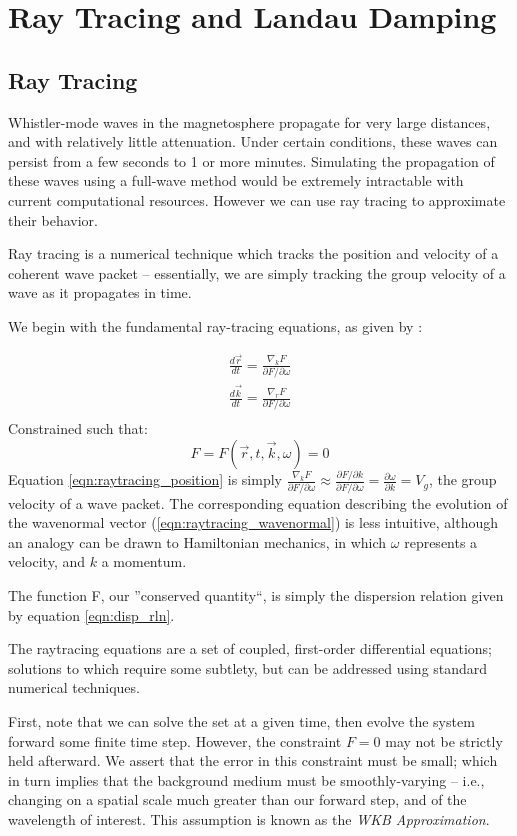 \section{Ray Tracing and Landau Damping}
\subsection{Ray Tracing}
Whistler-mode waves in the magnetosphere propagate for very large distances, and with relatively little attenuation. Under certain conditions, these waves can persist from a few seconds to 1 or more minutes. Simulating the propagation of these waves using a full-wave method would be extremely intractable with current computational resources. However we can use ray tracing to approximate their behavior.

Ray tracing is a numerical technique which tracks the position and velocity of a coherent wave packet -- essentially, we are simply tracking the group velocity of a wave as it propagates in time. 

We begin with the fundamental ray-tracing equations, as given by \cite{Stix1992}:

\begin{eqnarray}
\frac{d\vec{r}}{dt} = \frac{\nabla_kF}{\partial F/\partial \omega} \label{eqn:raytracing_position}\\
\frac{d\vec{k}}{dt} = \frac{\nabla_rF}{\partial F/\partial \omega} \label{eqn:raytracing_wavenormal} \\
\end{eqnarray}
Constrained such that:
\begin{equation}
F = F(\vec{r},t,\vec{k},\omega) = 0
\end{equation}
Equation \ref{eqn:raytracing_position} is simply $\frac{\nabla_kF}{\partial F/\partial \omega} \approx\frac{\partial F/\partial k}{\partial F /\partial \omega} = \frac{\partial \omega}{\partial k} = V_g$, the group velocity of a wave packet. The corresponding equation describing the evolution of the wavenormal vector (\ref{eqn:raytracing_wavenormal}) is less intuitive, although an analogy can be drawn to Hamiltonian mechanics, in which $\omega$ represents a velocity, and $k$ a momentum.

The function F, our ''conserved quantity``, is simply the dispersion relation given by equation \ref{eqn:disp_rln}.

The raytracing equations are a set of coupled, first-order differential equations; solutions to which require some subtlety, but can be addressed using standard numerical techniques.

First, note that we can solve the set at a given time, then evolve the system forward some finite time step. However, the constraint $F=0$ may not be strictly held afterward. We assert that the error in this constraint must be small; which in turn implies that the background medium must be smoothly-varying -- i.e., changing on a spatial scale much greater than our forward step, and of the wavelength of interest. This assumption is known as the \emph{WKB Approximation}. 